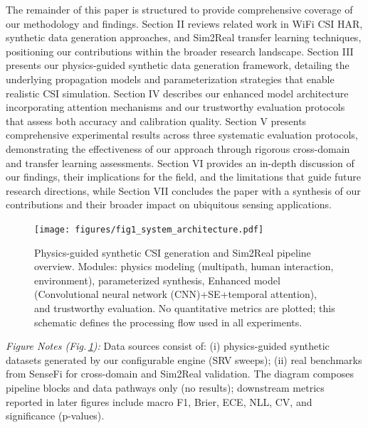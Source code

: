 \documentclass[journal]{IEEEtran}
\begin{document}
The remainder of this paper is structured to provide comprehensive coverage of our methodology and findings. Section II reviews related work in WiFi CSI HAR, synthetic data generation approaches, and Sim2Real transfer learning techniques, positioning our contributions within the broader research landscape. Section III presents our physics-guided synthetic data generation framework, detailing the underlying propagation models and parameterization strategies that enable realistic CSI simulation. Section IV describes our enhanced model architecture incorporating attention mechanisms and our trustworthy evaluation protocols that assess both accuracy and calibration quality. Section V presents comprehensive experimental results across three systematic evaluation protocols, demonstrating the effectiveness of our approach through rigorous cross-domain and transfer learning assessments. Section VI provides an in-depth discussion of our findings, their implications for the field, and the limitations that guide future research directions, while Section VII concludes the paper with a synthesis of our contributions and their broader impact on ubiquitous sensing applications.


\begin{figure}[t]
\centering
\texttt{[image: figures/fig1\_system\_architecture.pdf]}
\caption{ Physics-guided synthetic CSI generation and Sim2Real pipeline overview. Modules: physics modeling (multipath, human interaction, environment), parameterized synthesis, Enhanced model (Convolutional neural network (CNN)+SE+temporal attention), and trustworthy evaluation. No quantitative metrics are plotted; this schematic defines the processing flow used in all experiments.}
\label{fig:system_overview}
\end{figure}

\noindent\textit{Figure Notes (Fig.\,\ref{fig:system_overview}):} Data sources consist of: (i) physics-guided synthetic datasets generated by our configurable engine (SRV sweeps); (ii) real benchmarks from SenseFi for cross-domain and Sim2Real validation. The diagram composes pipeline blocks and data pathways only (no results); downstream metrics reported in later figures include macro F1, Brier, ECE, NLL, CV, and significance (p-values).
\end{document}
